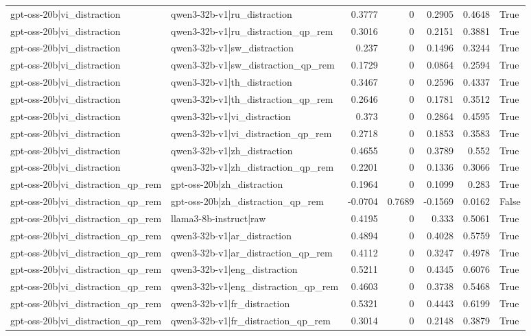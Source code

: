 \begin{table}
\begin{tabular}{l l r r r r l}
gpt-oss-20b|vi_distraction & qwen3-32b-v1|ru_distraction & 0.3777 & 0 & 0.2905 & 0.4648 & True \\
gpt-oss-20b|vi_distraction & qwen3-32b-v1|ru_distraction_qp_rem & 0.3016 & 0 & 0.2151 & 0.3881 & True \\
gpt-oss-20b|vi_distraction & qwen3-32b-v1|sw_distraction & 0.237 & 0 & 0.1496 & 0.3244 & True \\
gpt-oss-20b|vi_distraction & qwen3-32b-v1|sw_distraction_qp_rem & 0.1729 & 0 & 0.0864 & 0.2594 & True \\
gpt-oss-20b|vi_distraction & qwen3-32b-v1|th_distraction & 0.3467 & 0 & 0.2596 & 0.4337 & True \\
gpt-oss-20b|vi_distraction & qwen3-32b-v1|th_distraction_qp_rem & 0.2646 & 0 & 0.1781 & 0.3512 & True \\
gpt-oss-20b|vi_distraction & qwen3-32b-v1|vi_distraction & 0.373 & 0 & 0.2864 & 0.4595 & True \\
gpt-oss-20b|vi_distraction & qwen3-32b-v1|vi_distraction_qp_rem & 0.2718 & 0 & 0.1853 & 0.3583 & True \\
gpt-oss-20b|vi_distraction & qwen3-32b-v1|zh_distraction & 0.4655 & 0 & 0.3789 & 0.552 & True \\
gpt-oss-20b|vi_distraction & qwen3-32b-v1|zh_distraction_qp_rem & 0.2201 & 0 & 0.1336 & 0.3066 & True \\
gpt-oss-20b|vi_distraction_qp_rem & gpt-oss-20b|zh_distraction & 0.1964 & 0 & 0.1099 & 0.283 & True \\
gpt-oss-20b|vi_distraction_qp_rem & gpt-oss-20b|zh_distraction_qp_rem & -0.0704 & 0.7689 & -0.1569 & 0.0162 & False \\
gpt-oss-20b|vi_distraction_qp_rem & llama3-8b-instruct|raw & 0.4195 & 0 & 0.333 & 0.5061 & True \\
gpt-oss-20b|vi_distraction_qp_rem & qwen3-32b-v1|ar_distraction & 0.4894 & 0 & 0.4028 & 0.5759 & True \\
gpt-oss-20b|vi_distraction_qp_rem & qwen3-32b-v1|ar_distraction_qp_rem & 0.4112 & 0 & 0.3247 & 0.4978 & True \\
gpt-oss-20b|vi_distraction_qp_rem & qwen3-32b-v1|eng_distraction & 0.5211 & 0 & 0.4345 & 0.6076 & True \\
gpt-oss-20b|vi_distraction_qp_rem & qwen3-32b-v1|eng_distraction_qp_rem & 0.4603 & 0 & 0.3738 & 0.5468 & True \\
gpt-oss-20b|vi_distraction_qp_rem & qwen3-32b-v1|fr_distraction & 0.5321 & 0 & 0.4443 & 0.6199 & True \\
gpt-oss-20b|vi_distraction_qp_rem & qwen3-32b-v1|fr_distraction_qp_rem & 0.3014 & 0 & 0.2148 & 0.3879 & True \\

\end{tabular}
\end{table}
